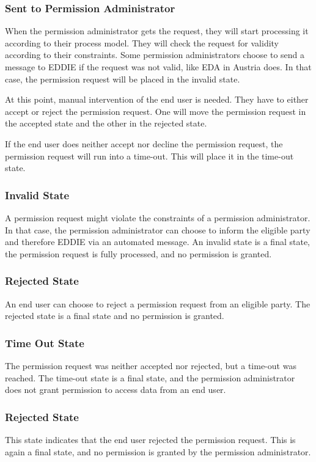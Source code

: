 \subsubsection{Sent to Permission Administrator}
When the permission administrator gets the request, they will start processing it according to their process model.
They will check the request for validity according to their constraints.
Some permission administrators choose to send a message to EDDIE if the request was not valid, like EDA in Austria does.
In that case, the permission request will be placed in the invalid state.

At this point, manual intervention of the end user is needed.
They have to either accept or reject the permission request.
One will move the permission request in the accepted state and the other in the rejected state.

If the end user does neither accept nor decline the permission request, the permission request will run into a time-out.
This will place it in the time-out state.

\subsubsection{Invalid State}
A permission request might violate the constraints of a permission administrator.
In that case, the permission administrator can choose to inform the eligible party and therefore EDDIE via an automated message.
An invalid state is a final state, the permission request is fully processed, and no permission is granted.

\subsubsection{Rejected State}
An end user can choose to reject a permission request from an eligible party.
The rejected state is a final state and no permission is granted.

\subsubsection{Time Out State}
The permission request was neither accepted nor rejected, but a time-out was reached.
The time-out state is a final state, and the permission administrator does not grant permission to access data from an end user.

\subsubsection{Rejected State}
This state indicates that the end user rejected the permission request.
This is again a final state, and no permission is granted by the permission administrator.

